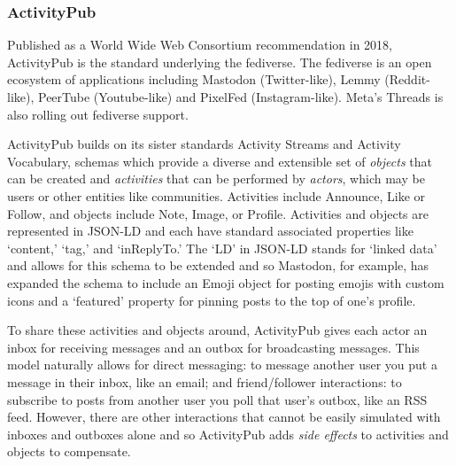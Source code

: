 
\subsubsection{ActivityPub}

Published as a World Wide Web Consortium recommendation in 2018, ActivityPub is the standard underlying the fediverse. The fediverse is an open ecosystem of applications including Mastodon (Twitter-like), Lemmy (Reddit-like), PeerTube (Youtube-like) and PixelFed (Instagram-like).
Meta's Threads is also rolling out fediverse support.

ActivityPub builds on its sister standards Activity Streams and Activity Vocabulary, schemas which provide a diverse and extensible set of \emph{objects} that can be created and \emph{activities} that can be performed by \emph{actors}, which may be users or other entities like communities.
Activities include Announce, Like or Follow, and objects include Note, Image, or Profile.
Activities and objects are represented in JSON-LD and each have standard associated properties like `content,' `tag,' and `inReplyTo.'
The `LD' in JSON-LD stands for `linked data' and allows for this schema to be extended and so
Mastodon, for example, has expanded the schema to include an Emoji object for posting emojis with custom icons and a `featured' property for pinning posts to the top of one's profile.

To share these activities and objects around, ActivityPub gives each actor an inbox for receiving messages and an outbox for broadcasting messages.
This model naturally allows for direct messaging: to message another user you put a message in their inbox, like an email; and friend/follower interactions: to subscribe to posts from another user you poll that user's outbox, like an RSS feed.
However, there are other interactions that cannot be easily simulated with inboxes and outboxes alone and so ActivityPub adds \emph{side effects} to activities and objects to compensate.

